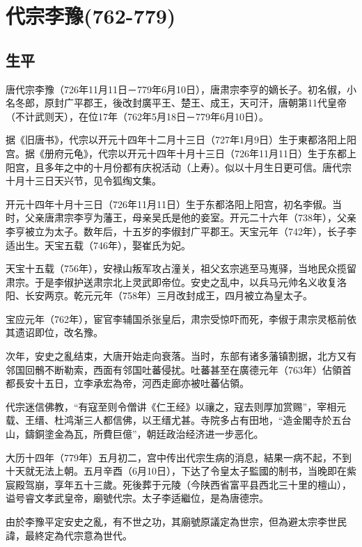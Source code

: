 
\section{代宗李豫\tiny(762-779)}

\subsection{生平}

唐代宗李豫（726年11月11日－779年6月10日），唐肃宗李亨的嫡长子。初名俶，小名冬郎，原封广平郡王，後改封廣平王、楚王、成王，天可汗，唐朝第11代皇帝（不计武则天），在位17年（762年5月18日－779年6月10日）。

据《旧唐书》，代宗以开元十四年十二月十三日（727年1月9日）生于東都洛阳上阳宫。据《册府元龟》，代宗以开元十四年十月十三日（726年11月11日）生于东都上阳宫，且多年之中的十月份都有庆祝活动（上寿）。似以十月生日更可信。唐代宗十月十三日天兴节，见令狐绹文集。

开元十四年十月十三日（726年11月11日）生于东都洛阳上阳宫，初名李俶。当时，父亲唐肃宗李亨为藩王，母亲吴氏是他的妾室。开元二十六年（738年），父亲李亨被立为太子。数年后，十五岁的李俶封广平郡王。天宝元年（742年），长子李适出生。天宝五载（746年），娶崔氏为妃。

天宝十五载（756年），安禄山叛军攻占潼关，祖父玄宗逃至马嵬驿，当地民众揽留肃宗。于是李俶护送肃宗北上灵武即帝位。安史之乱中，以兵马元帅名义收复洛阳、长安两京。乾元元年（758年）三月改封成王，四月被立為皇太子。

宝应元年（762年），宦官李辅国杀张皇后，肃宗受惊吓而死，李俶于肃宗灵柩前依其遗诏即位，改名豫。

次年，安史之亂结束，大唐开始走向衰落。当时，东部有诸多藩镇割据，北方又有邻国回鶻不断勒索，西面有邻国吐蕃侵扰。吐蕃甚至在廣德元年（763年）佔領首都長安十五日，立李承宏為帝，河西走廊亦被吐蕃佔領。

代宗迷信佛教，“有寇至则令僧讲《仁王经》以禳之，寇去则厚加赏赐”，宰相元载、王缙、杜鸿渐三人都信佛，以王缙尤甚。寺院多占有田地，“造金閣寺於五台山，鑄銅塗金為瓦，所費巨億”，朝廷政治经济进一步恶化。

大历十四年（779年）五月初二，宫中传出代宗生病的消息，結果一病不起，不到十天就无法上朝。五月辛酉（6月10日），下达了令皇太子監國的制书，当晚即在紫宸殿驾崩，享年五十三歲。死後葬于元陵（今陕西省富平县西北三十里的檀山），谥号睿文孝武皇帝，廟號代宗。太子李适繼位，是為唐德宗。

由於李豫平定安史之亂，有不世之功，其廟號原議定為世宗，但為避太宗李世民諱，最終定為代宗意為世代。


